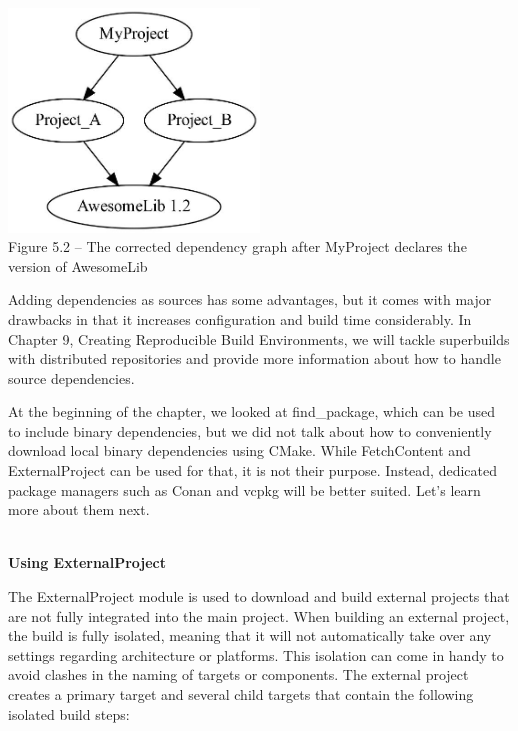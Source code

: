 \begin{center}
\includegraphics[width=0.5\textwidth]{content/2/chapter5/images/2.jpg}\\
Figure 5.2 – The corrected dependency graph after MyProject declares the version of AwesomeLib
\end{center}

Adding dependencies as sources has some advantages, but it comes with major drawbacks in that it increases configuration and build time considerably. In Chapter 9, Creating Reproducible Build Environments, we will tackle superbuilds with distributed repositories and provide more information about how to handle source dependencies.

At the beginning of the chapter, we looked at find\_package, which can be used to include binary dependencies, but we did not talk about how to conveniently download local binary dependencies using CMake. While FetchContent and ExternalProject can be used for that, it is not their purpose. Instead, dedicated package managers such as Conan and vcpkg will be better suited. Let's learn more about them next.

\hspace*{\fill} \\ %
\noindent
\textbf{Using ExternalProject}

The ExternalProject module is used to download and build external projects that are not fully integrated into the main project. When building an external project, the build is fully isolated, meaning that it will not automatically take over any settings regarding architecture or platforms. This isolation can come in handy to avoid clashes in the naming of targets or components. The external project creates a primary target and several child targets that contain the following isolated build steps:

